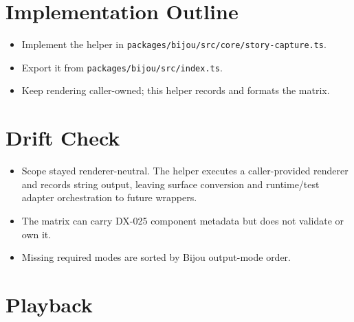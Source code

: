 \section{Implementation Outline}\label{record-089-implementation-outline}

\begin{itemize}
\tightlist
\item
  Implement the helper in \texttt{p\allowbreak{}a\allowbreak{}c\allowbreak{}k\allowbreak{}a\allowbreak{}g\allowbreak{}e\allowbreak{}s\allowbreak{}/\allowbreak{}b\allowbreak{}i\allowbreak{}j\allowbreak{}o\allowbreak{}u\allowbreak{}/\allowbreak{}s\allowbreak{}r\allowbreak{}c\allowbreak{}/\allowbreak{}c\allowbreak{}o\allowbreak{}r\allowbreak{}e\allowbreak{}/\allowbreak{}s\allowbreak{}t\allowbreak{}o\allowbreak{}r\allowbreak{}y\allowbreak{}-\allowbreak{}c\allowbreak{}a\allowbreak{}p\allowbreak{}t\allowbreak{}u\allowbreak{}r\allowbreak{}e\allowbreak{}.\allowbreak{}t\allowbreak{}s}.
\item
  Export it from \texttt{p\allowbreak{}a\allowbreak{}c\allowbreak{}k\allowbreak{}a\allowbreak{}g\allowbreak{}e\allowbreak{}s\allowbreak{}/\allowbreak{}b\allowbreak{}i\allowbreak{}j\allowbreak{}o\allowbreak{}u\allowbreak{}/\allowbreak{}s\allowbreak{}r\allowbreak{}c\allowbreak{}/\allowbreak{}i\allowbreak{}n\allowbreak{}d\allowbreak{}e\allowbreak{}x\allowbreak{}.\allowbreak{}t\allowbreak{}s}.
\item
  Keep rendering caller-owned; this helper records and formats the matrix.
\end{itemize}

\section{Drift Check}\label{record-089-drift-check}

\begin{itemize}
\tightlist
\item
  Scope stayed renderer-neutral. The helper executes a caller-provided renderer and records string output, leaving surface conversion and runtime/test adapter orchestration to future wrappers.
\item
  The matrix can carry DX-025 component metadata but does not validate or own it.
\item
  Missing required modes are sorted by Bijou output-mode order.
\end{itemize}

\section{Playback}\label{record-089-playback}

